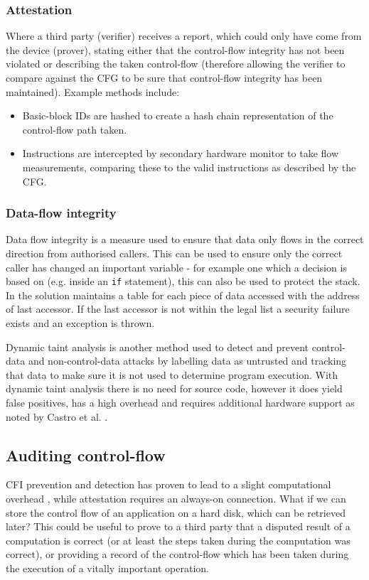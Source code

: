 \subsubsection{Attestation}
Where a third party (verifier) receives a report, which could only have come from the device (prover), stating either that the control-flow integrity has not been violated or describing the taken control-flow (therefore allowing the verifier to compare against the CFG to be sure that control-flow integrity has been maintained). Example methods include:
\begin{itemize}
	\item Basic-block IDs are hashed to create a hash chain representation of the control-flow path taken.
	\item Instructions are intercepted by secondary hardware monitor to take flow measurements, comparing these to the valid instructions as described by the CFG.
\end{itemize}

\subsubsection{Data-flow integrity}

Data flow integrity \cite{Castro2006} is a measure used to ensure that data only flows in the correct direction from authorised callers. This can be used to ensure only the correct caller has changed an important variable - for example one which a decision is based on (e.g. inside an \verb|if| statement), this can also be used to protect the stack.
In  \cite{Castro2006} the solution maintains a table for each piece of data accessed with the address of last accessor. If the last accessor is not within the legal list a security failure exists and an exception is thrown.

Dynamic taint analysis \cite{Davi2009} is another method used to detect and prevent control-data and non-control-data attacks by labelling data as untrusted and tracking that data to make sure it is not used to determine program execution. With dynamic taint analysis there is no need for source code, however it does yield false positives, has a high overhead and requires additional hardware support as noted by Castro et al. \cite{Castro2006}.

\subsection{Auditing control-flow}
CFI prevention and detection has proven to lead to a slight computational overhead \cite{DeClercq2017}, while attestation requires an always-on connection. What if we can store the control flow of an application on a hard disk, which can be retrieved later? This could be useful to prove to a third party that a disputed result of a computation is correct (or at least the steps taken during the computation was correct), or providing a record of the control-flow which has been taken during the execution of a  vitally important operation.

